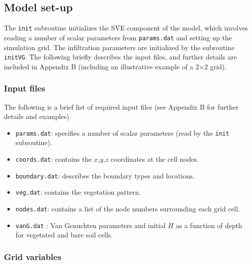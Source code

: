 \documentclass{article}
\newcommand{\code}[1]{\texttt{#1}}
\begin{document}
\subsection{Model set-up}
\label{SVEinit}
	
The \code{init} subroutine initializes the SVE component of the model,  which involves reading a number of scalar parameters from  \code{params.dat} and setting up the simulation grid.
 The infiltration parameters are initialized by the subroutine \code{initVG}.  The following briefly describes the input files, and further details are included in Appendix B (including an illustrative example of a  2$\times$2 grid).
  
\subsubsection*{Input files}

The following is a brief list of required input files (see Appendix B for further details and examples).

\begin{itemize}

	\item \code{params.dat}:  specifies a number of scalar parameters (read by the \code{init} subroutine).  

	\item \code{coords.dat}: contains the $x$,$y$,$z$ coordinates at the cell nodes.

	\item \code{boundary.dat}: describes the boundary types and locations.

	\item \code{veg.dat}: contains the vegetation pattern.

	\item \code{nodes.dat}: contains a list of the node numbers surrounding each grid cell.

	\item \code{vanG.dat} : Van Genuchten parameters and initial $H$ as a function of depth for vegetated and bare soil cells. 

\end{itemize}



\subsubsection*{Grid variables}
\end{document}
